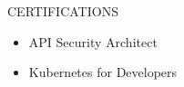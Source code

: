 \documentclass{resume}
\begin{document}

\begin{rSection}{CERTIFICATIONS}

\begin{itemize}
    \item API Security Architect
    \item Kubernetes for Developers
\end{itemize}

\end{rSection}
\end{document}
